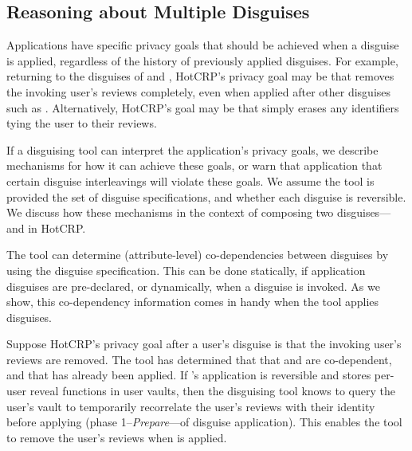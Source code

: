 \subsection{Reasoning about Multiple Disguises}
\label{sec:multi}

Applications have specific privacy goals that should be achieved when a disguise is applied,
regardless of the history of previously applied disguises. For example, returning to
the disguises of \gdpr and \ca {}, 
HotCRP's privacy goal may be that \gdpr removes the invoking user's reviews
completely, even when applied after other disguises such as \ca. 
Alternatively, HotCRP's goal may be that 
\gdpr simply erases any identifiers tying the user to their reviews. 

If a disguising tool can interpret the application's privacy goals, we describe mechanisms for how
it can achieve these goals, or warn that application that certain disguise interleavings will
violate these goals.
We assume the tool is provided the set of disguise specifications, and whether each disguise is
reversible.
We discuss how these mechanisms in the context of composing two disguises---\gdpr and \ca in HotCRP.

The tool can determine (attribute-level) co-dependencies between disguises by using the disguise
specification. This can be done statically, if application disguises are pre-declared, or
dynamically, when a disguise is invoked.  As we show, this co-dependency information comes in handy
when the tool applies disguises.

Suppose HotCRP's privacy goal after a user's \gdpr disguise is that the invoking user's
reviews are removed. The tool has determined that that \gdpr and \ca are co-dependent, and that \ca has already
been applied.
%
If \ca's application is reversible and stores per-user reveal functions in user vaults, then the
disguising tool knows to query the user's vault to temporarily recorrelate the user's reviews with
their identity before applying \gdpr (phase 1--\emph{Prepare}---of disguise application). This
enables the tool to remove the user's reviews when \gdpr is applied.
%

